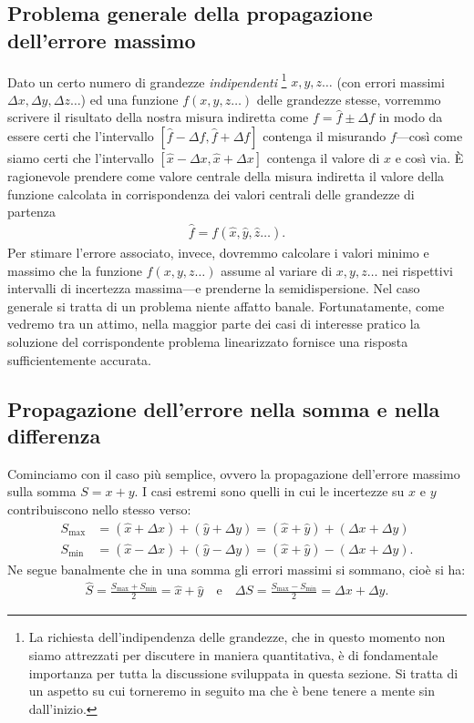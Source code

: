 \subsection{Problema generale della propagazione dell'errore massimo}

Dato un certo numero di grandezze \emph{indipendenti}%
\footnote{La richiesta dell'indipendenza delle grandezze, che in questo
  momento non siamo attrezzati per discutere in maniera quantitativa, è
  di fondamentale importanza per tutta la discussione sviluppata in questa
  sezione. Si tratta di un aspetto su cui torneremo in seguito ma che è bene
  tenere a mente sin dall'inizio.}
$x, y, z\ldots$ (con errori massimi $\Delta x, \Delta y, \Delta z\ldots$) ed
una funzione $f(x, y, z\ldots)$ delle grandezze stesse, vorremmo scrivere il
risultato della nostra misura indiretta come $f = \hat{f} \pm \Delta f$ in modo
da essere certi che l'intervallo $[\hat{f} - \Delta f, \hat{f} + \Delta f]$
contenga il misurando $f$---così come siamo certi che l'intervallo
$[\hat{x} - \Delta x, \hat{x} + \Delta x]$ contenga il valore di $x$ e così
via.
\`E ragionevole prendere come valore centrale della misura indiretta il valore
della funzione calcolata in corrispondenza dei valori centrali delle
grandezze di partenza
\begin{align*}
  \hat{f} = f(\hat{x}, \hat{y}, \hat{z}\ldots).
\end{align*}
Per stimare l'errore associato, invece, dovremmo calcolare i valori minimo e
massimo che la funzione $f(x, y, z\ldots)$ assume al variare di $x, y, z\ldots$
nei rispettivi intervalli di incertezza massima---e prenderne la
semidispersione. Nel caso generale si tratta di un problema niente affatto
banale. Fortunatamente, come vedremo tra un attimo, nella maggior parte dei
casi di interesse pratico la soluzione del corrispondente problema linearizzato
fornisce una risposta sufficientemente accurata.


\subsection{Propagazione dell'errore nella somma e nella differenza}

Cominciamo con il caso più semplice, ovvero la propagazione dell'errore
massimo sulla somma $S = x + y$. I casi estremi sono quelli in cui le
incertezze su $x$ e $y$ contribuiscono nello stesso verso:
\begin{align*}
  S_{\max} &= (\hat{x} + \Delta x) + (\hat{y} + \Delta y) =
  (\hat{x} + \hat{y}) + (\Delta x + \Delta y)\\
  S_{\min} &= (\hat{x} - \Delta x) + (\hat{y} - \Delta y) =
  (\hat{x} + \hat{y}) - (\Delta x + \Delta y).
\end{align*}
Ne segue banalmente che in una somma gli errori massimi si sommano, cioè
si ha:
\begin{align}\label{eq:errore_max_somma}
  \hat{S} = \frac{S_{\max} + S_{\min}}{2} = \hat{x} + \hat{y}
  \quad \text{e} \quad
  \Delta S = \frac{S_{\max} - S_{\min}}{2} = \Delta x + \Delta y.
\end{align}

